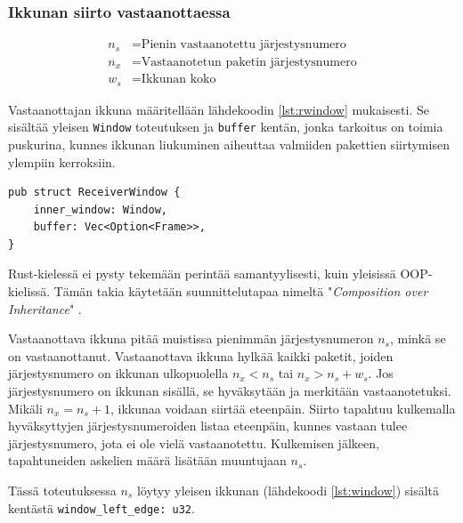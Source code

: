 \documentclass[a4paper,12pt]{article}
\begin{document}
\newpage

    \subsubsection{Ikkunan siirto vastaanottaessa}

    \begin{align}
        n_s &= \text{Pienin vastaanotettu järjestysnumero} \\
        n_x &= \text{Vastaanotetun paketin järjestysnumero} \\
        w_s &= \text{Ikkunan koko}
    \end{align}



    Vastaanottajan ikkuna määritellään lähdekoodin \ref{lst:rwindow} mukaisesti. Se sisältää yleisen \lstinline{Window} toteutuksen ja \lstinline{buffer} kentän, jonka tarkoitus on toimia puskurina, kunnes ikkunan liukuminen aiheuttaa valmiiden pakettien siirtymisen ylempiin kerroksiin. \par
    
\begin{lstlisting}[caption={Vastaanottajan ikkunan rakenne}, label={lst:rwindow}]
pub struct ReceiverWindow {
    inner_window: Window,
    buffer: Vec<Option<Frame>>,
}\end{lstlisting}

    \begin{framed}
        Rust-kielessä ei pysty tekemään perintää samantyylisesti, kuin yleisissä OOP-kielissä. Tämän takia
        käytetään suunnittelutapaa nimeltä "\textit{Composition over Inheritance}" \cite{Ivicevic202228Inheritance}.
    \end{framed}

    Vastaanottava ikkuna pitää muistissa pienimmän järjestysnumeron $n_s$, minkä se on vastaanottanut.
    Vastaanottava ikkuna hylkää kaikki paketit, joiden järjestysnumero on ikkunan ulkopuolella $n_x < n_s$ tai $n_x > n_s + w_s$. Jos järjestysnumero on ikkunan sisällä, se hyväksytään ja merkitään vastaanotetuksi. Mikäli $n_x = n_s + 1$, ikkunaa voidaan siirtää eteenpäin.
    Siirto tapahtuu kulkemalla hyväksyttyjen järjestysnumeroiden listaa eteenpäin, kunnes vastaan tulee järjestysnumero, jota ei ole vielä vastaanotettu. Kulkemisen jälkeen, tapahtuneiden askelien määrä lisätään muuntujaan $n_s$.

    Tässä toteutuksessa $n_s$ löytyy yleisen ikkunan (lähdekoodi \ref{lst:window}) sisältä kentästä \lstinline{window_left_edge: u32}.
\end{document}
